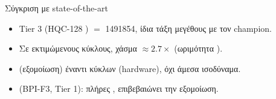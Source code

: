 \begin{frame}{Σύγκριση με state-of-the-art}
  \begin{itemize}
    \item Tier 3 \instret (HQC-128 ) $=$ \num{1491854}, ίδια τάξη μεγέθους με τον  champion.
    \item Σε εκτιμώμενους κύκλους, χάσμα $\approx 2.7\times$ (ωριμότητα ).
    \item {} \instret (εξομοίωση) έναντι κύκλων (hardware), όχι άμεσα ισοδύναμα.
    \item {} (BPI-F3, Tier 1):  πλήρες , επιβεβαιώνει την εξομοίωση.
  \end{itemize}
\end{frame}
